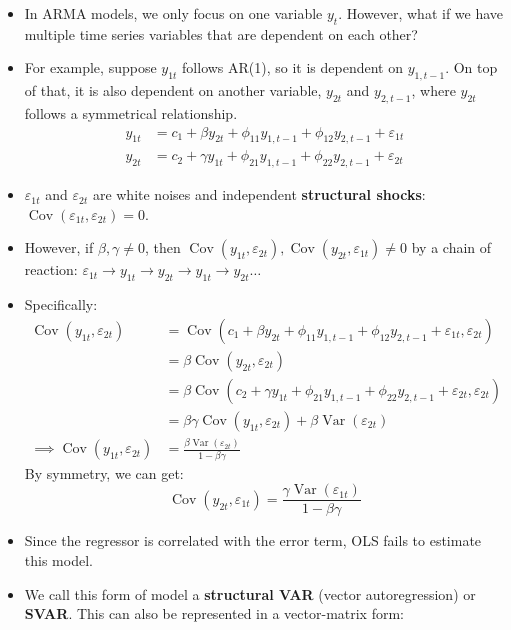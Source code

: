 \documentclass[notitlepage]{article}
\DeclareMathOperator{\Var}{Var}
\DeclareMathOperator{\Cov}{Cov}
\begin{document}
\begin{itemize}
    \item In ARMA models, we only focus on one variable \(y_t\). However, what if we have multiple time series variables that are dependent on each other?
    \item For example, suppose \(y_{1t}\) follows AR(1), so it is dependent on \(y_{1,t-1}\). On top of that, it is also dependent on another variable, \(y_{2t}\) and \(y_{2,t-1}\), where \(y_{2t}\) follows a symmetrical relationship.
    \begin{align*}
        y_{1t} &= c_1 + \beta y_{2t} + \phi_{11}y_{1,t-1} + \phi_{12}y_{2,t-1} + \varepsilon_{1t} \\
        y_{2t} &= c_2 + \gamma y_{1t} + \phi_{21}y_{1,t-1} + \phi_{22}y_{2,t-1} + \varepsilon_{2t}
    \end{align*}
    \item \(\varepsilon_{1t}\) and \(\varepsilon_{2t}\) are white noises and independent \textbf{structural shocks}: \(\Cov(\varepsilon_{1t}, \varepsilon_{2t}) = 0\).
    \item However, if \(\beta, \gamma \ne 0\), then \(\Cov(y_{1t}, \varepsilon_{2t}), \Cov(y_{2t}, \varepsilon_{1t}) \ne 0\) by a chain of reaction: \(\varepsilon_{1t} \rightarrow y_{1t} \rightarrow y_{2t} \rightarrow y_{1t} \rightarrow y_{2t} \dots\)
    \item Specifically:
    \begin{align*}
    \Cov(y_{1t}, \varepsilon_{2t}) &= \Cov(c_1 + \beta y_{2t} + \phi_{11}y_{1,t-1} + \phi_{12}y_{2,t-1} + \varepsilon_{1t}, \varepsilon_{2t}) \\
    &= \beta \Cov(y_{2t}, \varepsilon_{2t}) \\
    &= \beta \Cov(c_2 + \gamma y_{1t} + \phi_{21}y_{1,t-1} + \phi_{22}y_{2,t-1} + \varepsilon_{2t}, \varepsilon_{2t}) \\
    &= \beta\gamma \Cov(y_{1t}, \varepsilon_{2t}) + \beta \Var(\varepsilon_{2t}) \\
    \implies \Cov(y_{1t}, \varepsilon_{2t}) &= \frac{\beta \Var(\varepsilon_{2t})}{1-\beta\gamma}
    \end{align*}
    By symmetry, we can get:
    \[
    \Cov(y_{2t}, \varepsilon_{1t}) = \frac{\gamma \Var(\varepsilon_{1t})}{1-\beta\gamma}
    \]
    \item Since the regressor is correlated with the error term, OLS fails to estimate this model.
    \item We call this form of model a \textbf{structural VAR} (vector autoregression) or \textbf{SVAR}. This can also be represented in a vector-matrix form:

\end{itemize}
\end{document}
